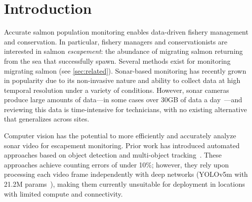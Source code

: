 \section{Introduction}
\label{sec:intro}






Accurate salmon population monitoring enables %
data-driven fishery management and conservation. In particular, fishery managers and conservationists are interested in salmon \textit{escapement}: the abundance of migrating salmon returning from the sea that successfully spawn. Several methods exist for monitoring migrating salmon (see \cref{sec:related}). 
Sonar-based monitoring has recently grown in popularity due to its non-invasive nature and ability to collect data at high temporal resolution under a variety of conditions.
However, sonar cameras produce large amounts of data---in some cases over 30GB of data a day~\cite{AlaskaSonar}---and 
reviewing this data
is time-intensive for technicians, with no existing alternative that generalizes across sites.

Computer vision has the potential to more efficiently and accurately analyze sonar video for escapement monitoring. Prior work has introduced automated approaches based on object detection and multi-object tracking~\cite{kay2022caltechfishcountingdataset}. These approaches achieve counting errors of under 10\%; however, they rely upon processing each video frame independently with deep networks (\eg YOLOv5m with 21.2M params~\cite{kay2022caltechfishcountingdataset}), making them currently unsuitable for deployment in locations with limited compute and connectivity.

